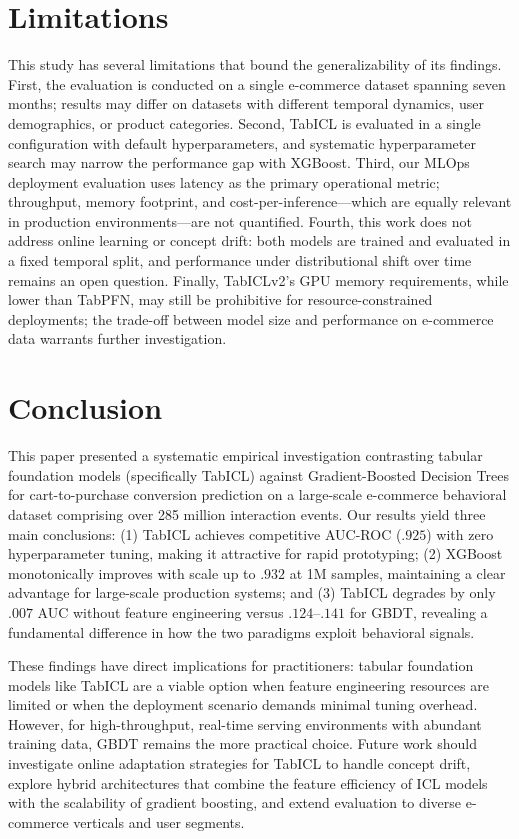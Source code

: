 \documentclass[conference]{IEEEtran}
\begin{document}
\section{Limitations}

This study has several limitations that bound the generalizability of its findings. First, the evaluation is conducted on a single e-commerce dataset spanning seven months; results may differ on datasets with different temporal dynamics, user demographics, or product categories. Second, TabICL is evaluated in a single configuration with default hyperparameters, and systematic hyperparameter search may narrow the performance gap with XGBoost. Third, our MLOps deployment evaluation uses latency as the primary operational metric; throughput, memory footprint, and cost-per-inference---which are equally relevant in production environments---are not quantified. Fourth, this work does not address online learning or concept drift: both models are trained and evaluated in a fixed temporal split, and performance under distributional shift over time remains an open question. Finally, TabICLv2's GPU memory requirements, while lower than TabPFN, may still be prohibitive for resource-constrained deployments; the trade-off between model size and performance on e-commerce data warrants further investigation.

\section{Conclusion}

This paper presented a systematic empirical investigation contrasting tabular foundation models (specifically TabICL) against Gradient-Boosted Decision Trees for cart-to-purchase conversion prediction on a large-scale e-commerce behavioral dataset comprising over 285 million interaction events. Our results yield three main conclusions: (1) TabICL achieves competitive AUC-ROC ($.925$) with zero hyperparameter tuning, making it attractive for rapid prototyping; (2) XGBoost monotonically improves with scale up to $.932$ at 1M samples, maintaining a clear advantage for large-scale production systems; and (3) TabICL degrades by only $.007$ AUC without feature engineering versus $.124$--$.141$ for GBDT, revealing a fundamental difference in how the two paradigms exploit behavioral signals.

These findings have direct implications for practitioners: tabular foundation models like TabICL are a viable option when feature engineering resources are limited or when the deployment scenario demands minimal tuning overhead. However, for high-throughput, real-time serving environments with abundant training data, GBDT remains the more practical choice. Future work should investigate online adaptation strategies for TabICL to handle concept drift, explore hybrid architectures that combine the feature efficiency of ICL models with the scalability of gradient boosting, and extend evaluation to diverse e-commerce verticals and user segments.

\balance


\end{document}
